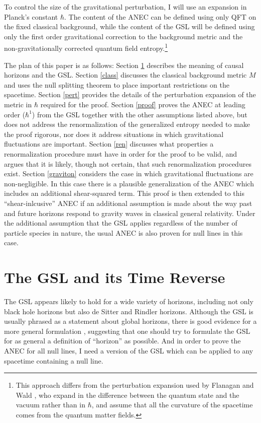 \documentclass[11pt]{article}
\begin{document}
To control the size of the gravitational perturbation, I will use an expansion in Planck's constant $\hbar$.  The content of the ANEC can be defined using only QFT on the fixed classical background, while the content of the GSL will be defined using only the first order gravitational correction to the background metric and the non-gravitationally corrected quantum field entropy.\footnote{This approach differs from the perturbation expansion used by Flanagan and Wald \cite{FM96}, who expand in the difference between the quantum state and the vacuum rather than in $\hbar$, and assume that all the curvature of the spacetime comes from the quantum matter fields.}

The plan of this paper is as follows: Section \ref{gsls} describes the meaning of causal horizons and the GSL.  Section \ref{class} discusses the classical background metric $M$ and uses the null splitting theorem to place important restrictions on the spacetime.  Section \ref{pert} provides the details of the perturbation expansion of the metric in $\hbar$ required for the proof.  Section \ref{proof} proves the ANEC at leading order ($\hbar^{1}$) from the GSL together with the other assumptions listed above, but does not address the renormalization of the generalized entropy needed to make the proof rigorous, nor does it address situations in which gravitational fluctuations are important.  Section \ref{ren} discusses what properties a renormalization procedure must have in order for the proof to be valid, and argues that it is likely, though not certain, that such renormalization procedures exist.  Section \ref{graviton} considers the case in which gravitational fluctuations are non-negligible.  In this case there is a plausible generalization of the ANEC which includes an additional shear-squared term.  This proof is then extended to this ``shear-inlcusive'' ANEC if an additional assumption is made about the way past and future horizons respond to gravity waves in classical general relativity.  Under the additional assumption that the GSL applies regardless of the number of particle species in nature, the usual ANEC is also proven for null lines in this case.

\section{The GSL and its Time Reverse}\label{gsls}

The GSL appears likely to hold for a wide variety of horizons, including not only black hole horizons but also de Sitter and Rindler horizons.  Although the GSL is usually phrased as a statement about global horizons, there is good evidence for a more general formulation \cite{JP03}, suggesting that one should try to formulate the GSL for as general a definition of ``horizon'' as possible.  And in order to prove the ANEC for all null lines, I need a version of the GSL which can be applied to any spacetime containing a null line.
\end{document}
